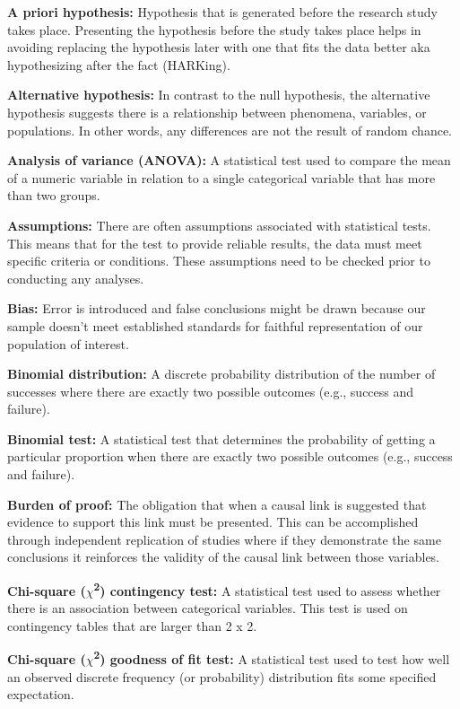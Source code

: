 \documentclass[
]{book}
\begin{document}
\textbf{A priori hypothesis:} Hypothesis that is generated before the research study takes place. Presenting the hypothesis before the study takes place helps in avoiding replacing the hypothesis later with one that fits the data better aka hypothesizing after the fact (HARKing).

\textbf{Alternative hypothesis:} In contrast to the null hypothesis, the alternative hypothesis suggests there is a relationship between phenomena, variables, or populations. In other words, any differences are not the result of random chance.

\textbf{Analysis of variance (ANOVA):} A statistical test used to compare the mean of a numeric variable in relation to a single categorical variable that has more than two groups.

\textbf{Assumptions:} There are often assumptions associated with statistical tests. This means that for the test to provide reliable results, the data must meet specific criteria or conditions. These assumptions need to be checked prior to conducting any analyses.

\textbf{Bias:} Error is introduced and false conclusions might be drawn because our sample doesn't meet established standards for faithful representation of our population of interest.

\textbf{Binomial distribution:} A discrete probability distribution of the number of successes where there are exactly two possible outcomes (e.g., success and failure).

\textbf{Binomial test:} A statistical test that determines the probability of getting a particular proportion when there are exactly two possible outcomes (e.g., success and failure).

\textbf{Burden of proof:} The obligation that when a causal link is suggested that evidence to support this link must be presented. This can be accomplished through independent replication of studies where if they demonstrate the same conclusions it reinforces the validity of the causal link between those variables.

\textbf{Chi-square (\(\chi\)\textsuperscript{2}) contingency test:} A statistical test used to assess whether there is an association between categorical variables. This test is used on contingency tables that are larger than 2 x 2.

\textbf{Chi-square (\(\chi\)\textsuperscript{2}) goodness of fit test:} A statistical test used to test how well an observed discrete frequency (or probability) distribution fits some specified expectation.
\end{document}
